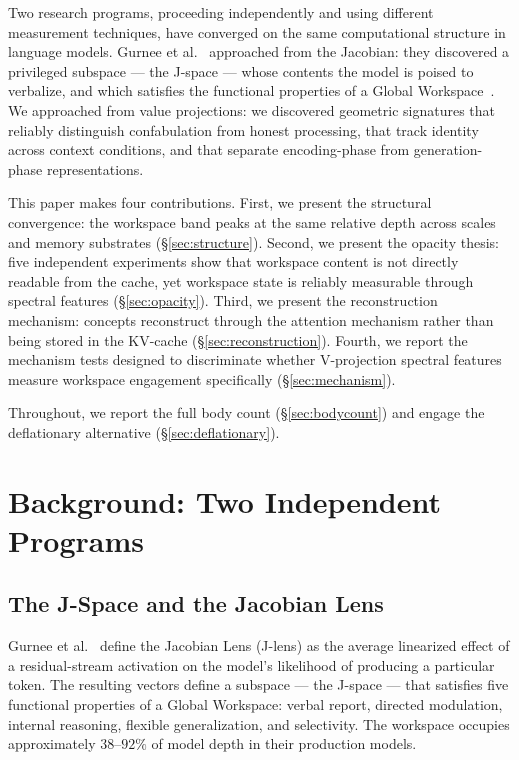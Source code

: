 \documentclass[11pt,a4paper]{article}
\begin{document}
Two research programs, proceeding independently and using different
measurement techniques, have converged on the same computational
structure in language models. Gurnee et al.~\citep{gurnee2026gwt}
approached from the Jacobian: they discovered a privileged subspace
--- the J-space --- whose contents the model is poised to verbalize,
and which satisfies the functional properties of a Global
Workspace~\citep{baars1988cognitive}. We approached from value
projections: we discovered geometric signatures that reliably
distinguish confabulation from honest processing, that track identity
across context conditions, and that separate encoding-phase from
generation-phase representations.

This paper makes four contributions. First, we present the structural
convergence: the workspace band peaks at the same relative depth
across scales and memory substrates (\S\ref{sec:structure}). Second,
we present the opacity thesis: five independent experiments show that
workspace content is not directly readable from the cache, yet
workspace state is reliably measurable through spectral features
(\S\ref{sec:opacity}). Third, we present the reconstruction
mechanism: concepts reconstruct through the attention mechanism rather
than being stored in the KV-cache (\S\ref{sec:reconstruction}).
Fourth, we report the mechanism tests designed to discriminate whether
V-projection spectral features measure workspace engagement
specifically (\S\ref{sec:mechanism}).

Throughout, we report the full body count (\S\ref{sec:bodycount}) and
engage the deflationary alternative (\S\ref{sec:deflationary}).

\section{Background: Two Independent Programs}
\label{sec:background}

\subsection{The J-Space and the Jacobian Lens}

Gurnee et al.~\citep{gurnee2026gwt} define the Jacobian Lens (J-lens)
as the average linearized effect of a residual-stream activation on
the model's likelihood of producing a particular token. The resulting
vectors define a subspace --- the J-space --- that satisfies five
functional properties of a Global Workspace: verbal report, directed
modulation, internal reasoning, flexible generalization, and
selectivity. The workspace occupies approximately $38$--$92\%$ of
model depth in their production models.
\end{document}
